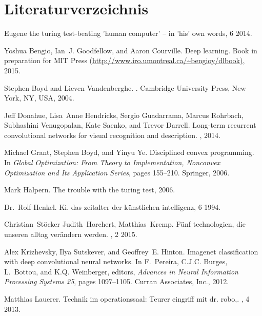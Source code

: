 \section*{Literaturverzeichnis}

\begin{thebibliography}{99}

Eugene the turing test-beating 'human computer' – in 'his' own words, 6 2014.

Yoshua Bengio, Ian~J. Goodfellow, and Aaron Courville.
\newblock Deep learning.
\newblock Book in preparation for MIT Press
  (\url{http://www.iro.umontreal.ca/~bengioy/dlbook)}, 2015.

Stephen Boyd and Lieven Vandenberghe.
.
\newblock Cambridge University Press, New York, NY, USA, 2004.

Jeff Donahue, Lisa~Anne Hendricks, Sergio Guadarrama, Marcus Rohrbach,
  Subhashini Venugopalan, Kate Saenko, and Trevor Darrell.
\newblock Long-term recurrent convolutional networks for visual recognition and
  description.
, 2014.

Michael Grant, Stephen Boyd, and Yinyu Ye.
\newblock Disciplined convex programming.
\newblock In {\em Global Optimization: From Theory to Implementation, Nonconvex
  Optimization and Its Application Series}, pages 155--210. Springer, 2006.

Mark Halpern.
\newblock The trouble with the turing test, 2006.

Dr.~Rolf Henkel.
\newblock Ki. das zeitalter der künstlichen intelligenz, 6 1994.

Christian~Stöcker Judith~Horchert, Matthias~Kremp.
\newblock Fünf technologien, die unseren alltag verändern werden.
, 2 2015.

Alex Krizhevsky, Ilya Sutskever, and Geoffrey~E. Hinton.
\newblock Imagenet classification with deep convolutional neural networks.
\newblock In F.~Pereira, C.J.C. Burges, L.~Bottou, and K.Q. Weinberger,
  editors, {\em Advances in Neural Information Processing Systems 25}, pages
  1097--1105. Curran Associates, Inc., 2012.

Matthias Lauerer.
\newblock Technik im operationssaal: Teurer eingriff mit dr. robo,.
, 4 2013.


\end{thebibliography}
